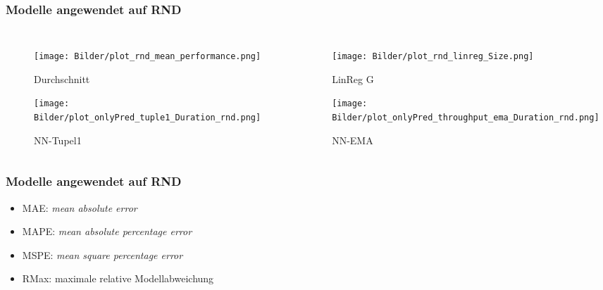 \documentclass{beamer}
\begin{document}
\begin{frame}
	\frametitle{Modelle angewendet auf RND}
	\begin{columns}
		\begin{figure}
			\texttt{[image: Bilder/plot\_rnd\_mean\_performance.png]}\\
			\vspace*{-0.45cm}
			\caption{Durchschnitt}
			\texttt{[image: Bilder/plot\_onlyPred\_tuple1\_Duration\_rnd.png]}
			\vspace*{-0.45cm}
			\caption{NN-Tupel1}
		\end{figure}
		\begin{figure}
			\texttt{[image: Bilder/plot\_rnd\_linreg\_Size.png]}\\
			\vspace*{-0.45cm}
			\caption{LinReg G}
			\texttt{[image: Bilder/plot\_onlyPred\_throughput\_ema\_Duration\_rnd.png]}
			\vspace*{-0.45cm}
			\caption{NN-EMA}
		\end{figure}
	\end{columns}
\end{frame}

\begin{frame}
\frametitle{Modelle angewendet auf RND}
\begin{table}
\end{table}
\begin{itemize}
\item MAE: \textit{mean absolute error}
\item MAPE: \textit{mean absolute percentage error}
\item MSPE: \textit{mean square percentage error}
\item RMax: maximale relative Modellabweichung
\end{itemize}
\end{frame}
\end{document}
